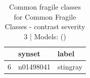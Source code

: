 \begin{table}
\caption{Common fragile classes for Common Fragile Classes - contrast severity 3 | Models: ()}
\label{tab:Common Fragile Classes - contrast severity 3_d41d8cd9}
\begin{tabular}{cll}
\toprule
 & synset & label \\
\midrule
6 & n01498041 & stingray \\
\bottomrule
\end{tabular}
\end{table}
